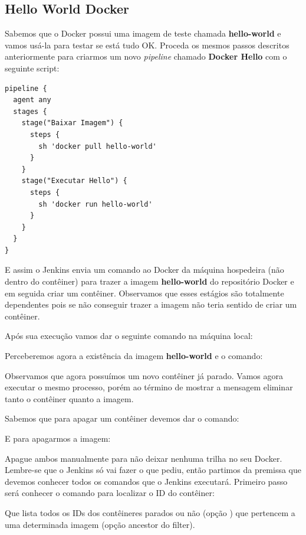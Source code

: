 \documentclass[a4paper,11pt]{article}
\begin{document}
\subsection{Hello World Docker}
Sabemos que o Docker possui uma imagem de teste chamada \textbf{hello-world} e vamos usá-la para testar se está tudo OK. Proceda os mesmos passos descritos anteriormente para criarmos um novo \textit{pipeline} chamado \textbf{Docker Hello} com o seguinte script:
\begin{lstlisting}
pipeline {
  agent any
  stages {
    stage("Baixar Imagem") {
      steps {
        sh 'docker pull hello-world'
      }
    }
    stage("Executar Hello") {
      steps {
        sh 'docker run hello-world'
      }
    }
  }
}
\end{lstlisting}

E assim o Jenkins envia um comando ao Docker da máquina hospedeira (não dentro do contêiner) para trazer a imagem \textbf{hello-world} do repositório Docker e em seguida criar um contêiner. Observamos que esses estágios são totalmente dependentes pois se não conseguir trazer a imagem não teria sentido de criar um contêiner.

Após sua execução vamos dar o seguinte comando na máquina local: \\

Perceberemos agora a existência da imagem \textbf{hello-world} e o comando: \\

Observamos que agora possuímos um novo contêiner já parado. Vamos agora executar o mesmo processo, porém ao término de mostrar a mensagem eliminar tanto o contêiner quanto a imagem. 

Sabemos que para apagar um contêiner devemos dar o comando: \\

E para apagarmos a imagem:

Apague ambos manualmente para não deixar nenhuma trilha no seu Docker. Lembre-se que o Jenkins só vai fazer o que pediu, então partimos da premissa que devemos conhecer todos os comandos que o Jenkins executará. Primeiro passo será conhecer o comando para localizar o ID do contêiner: \\

Que lista todos os IDs dos contêineres parados ou não (opção ) que pertencem a uma determinada imagem (opção ancestor do filter).
\end{document}
